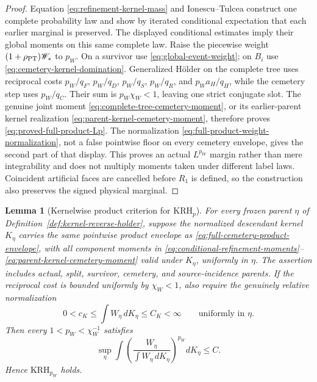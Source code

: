 \documentclass[11pt]{article}
\newtheorem{lemma}[theorem]{Lemma}
\begin{document}
\begin{proof}
Equation \eqref{eq:refinement-kernel-mass} and Ionescu--Tulcea construct one
complete probability law and show by iterated conditional expectation that
each earlier marginal is preserved.  The displayed conditional estimates
imply their global moments on this same complete law.  Raise the piecewise weight
$(1+\rho_{\rm PT})\mathscr W_*$ to $p_W$.  On a survivor use
\eqref{eq:global-event-weight}; on $B_i$ use
\eqref{eq:cemetery-kernel-domination}.  Generalized H\"older on the complete tree
uses reciprocal costs
$p_W/q_F$, $p_W/q_D$, $p_W/q_S$, $p_W/q_R$, and
$p_Wa_H/q_H$, while the cemetery step uses $p_W/q_C$.  Their sum is
$p_W\chi_W<1$, leaving one strict conjugate slot.  The genuine joint moment
\eqref{eq:complete-tree-cemetery-moment}, or its earlier-parent kernel
realization \eqref{eq:parent-kernel-cemetery-moment}, therefore proves
\eqref{eq:proved-full-product-Lp}.  The normalization
\eqref{eq:full-product-weight-normalization}, not a false pointwise floor on
every cemetery envelope, gives the second part of that display.  This proves an actual
$L^{p_W}$ margin rather than mere integrability and does not multiply moments
taken under different label laws.
Coincident artificial faces are cancelled before $R_1$ is defined, so the
construction also preserves the signed physical marginal.
\end{proof}

\begin{lemma}[Kernelwise product criterion for \(\mathrm{KRH}_p\)]
\label{lem:kernelwise-product-KRH}
For every frozen parent $\eta$ of
Definition~\ref{def:kernel-reverse-holder}, suppose the normalized descendant
kernel $K_\eta$ carries the same pointwise product envelope as
\eqref{eq:full-cemetery-product-envelope}, with all component moments in
\eqref{eq:conditional-refinement-moments}--
\eqref{eq:parent-kernel-cemetery-moment} valid under $K_\eta$, uniformly in
$\eta$.  The assertion includes actual, split, survivor, cemetery, and
source-incidence parents.  If the reciprocal cost is bounded uniformly by
$\chi_W<1$, also require the genuinely relative normalization
\begin{equation}
\label{eq:kernelwise-weight-normalization}
 0<c_K\le\int W_\eta\,dK_\eta\le C_K<\infty
 \qquad\text{uniformly in }\eta.
\end{equation}
Then every $1<p_W<\chi_W^{-1}$ satisfies
\begin{equation}
\label{eq:kernelwise-product-KRH}
 \sup_\eta\int
 \left(\frac{W_\eta}{\int W_\eta\,dK_\eta}\right)^{p_W}dK_\eta\le C.
\end{equation}
Hence \(\mathrm{KRH}_{p_W}\) holds.
\end{lemma}
\end{document}

